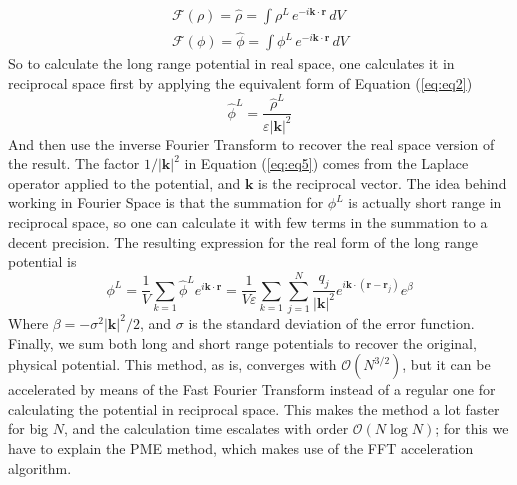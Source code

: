 \documentclass[a4paper, 12pt, notitlepage]{article}
\begin{document}
\begin{gather*}
	\mathcal{F} (\rho) = \hat{\rho} = \int\rho^L\, e^{-i\mathbf{k}\cdot\mathbf{r}}\, dV\\
	\mathcal{F} (\phi) = \hat{\phi} = \int\phi^L \, e^{-i\mathbf{k}\cdot\mathbf{r}}\, dV
\end{gather*}
So to calculate the long range potential in real space, one calculates it in reciprocal space first by applying the equivalent form of Equation (\ref{eq:eq2})
\begin{equation}
	\hat{\phi}^L = \frac{\hat{\rho}^L}{\varepsilon |\mathbf{k}|^2}\label{eq:eq5}
\end{equation}
And then use the inverse Fourier Transform to recover the real space version of the result. The factor $1/|\mathbf{k}|^2$ in Equation (\ref{eq:eq5}) comes from the Laplace operator applied to the potential, and $\mathbf{k}$ is  the reciprocal vector. The idea behind working in Fourier Space is that the summation for $\phi^L$ is actually short range in reciprocal space, so one can calculate it with few terms in the summation to a decent precision. The resulting expression for the real form of the long range potential is
\begin{equation}
	\phi^L = \frac{1}{V}\sum_{k=1}\hat{\phi}^L e^{i\mathbf{k}\cdot\mathbf{r}}= \frac{1}{V\varepsilon}\sum_{k = 1}\sum_{j = 1}^N \frac{q_j}{|\mathbf{k}|^2}e^{i\mathbf{k}\cdot(\mathbf{r} - \mathbf{r}_j)}e^{\beta}\label{eq:eq6}
\end{equation}
Where $\beta = -\sigma^2|\mathbf{k}|^2/2$, and $\sigma$ is the standard deviation of the error function.
Finally, we sum both long and short range potentials to recover the original, physical potential. This method, as is, converges with $\mathcal{O}(N^{3/2})$, but it can be accelerated by means of the Fast Fourier Transform instead of a regular one for calculating the potential in reciprocal space. This makes the method a lot faster for big $N$, and the calculation time escalates with order $\mathcal{O}(N\log N)$; for this we have to explain the PME method, which makes use of the FFT acceleration algorithm.
\end{document}
